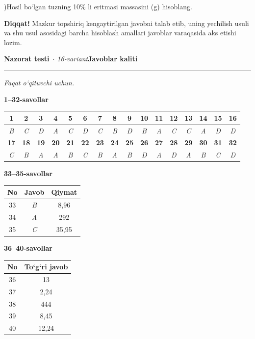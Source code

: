 \documentclass[11pt,a4paper]{article}
\newcommand{\diqqat}[1]{\par\smallskip\noindent\textbf{Diqqat!} #1\par\medskip}
\begin{document}
)Hosil bo`lgan tuzning 10\% li eritmasi massasini (g) hisoblang.\par
\diqqat{Mazkur topshiriq kengaytirilgan javobni talab etib, uning yechilish usuli va shu usul asosidagi barcha hisoblash amallari javoblar varaqasida aks etishi lozim.}
\newpage
\noindent\textbf{\fontsize{13}{15}\selectfont Nazorat testi}\ \textit{$\cdot$ 16-variant}\hfill \textbf{Javoblar kaliti}\par\smallskip\hrule\smallskip
\textit{Faqat o`qituvchi uchun.}\par\medskip
\noindent\textbf{1--32-savollar}\par\smallskip
\noindent\begin{tabular}{|c|c|c|c|c|c|c|c|c|c|c|c|c|c|c|c|}\hline
\textbf{1} & \textbf{2} & \textbf{3} & \textbf{4} & \textbf{5} & \textbf{6} & \textbf{7} & \textbf{8} & \textbf{9} & \textbf{10} & \textbf{11} & \textbf{12} & \textbf{13} & \textbf{14} & \textbf{15} & \textbf{16}\\\hline
\textsl{B} & \textsl{C} & \textsl{D} & \textsl{A} & \textsl{C} & \textsl{D} & \textsl{C} & \textsl{B} & \textsl{D} & \textsl{B} & \textsl{A} & \textsl{C} & \textsl{C} & \textsl{A} & \textsl{D} & \textsl{D}\\\hline
\textbf{17} & \textbf{18} & \textbf{19} & \textbf{20} & \textbf{21} & \textbf{22} & \textbf{23} & \textbf{24} & \textbf{25} & \textbf{26} & \textbf{27} & \textbf{28} & \textbf{29} & \textbf{30} & \textbf{31} & \textbf{32}\\\hline
\textsl{C} & \textsl{B} & \textsl{A} & \textsl{A} & \textsl{B} & \textsl{C} & \textsl{B} & \textsl{A} & \textsl{B} & \textsl{D} & \textsl{A} & \textsl{D} & \textsl{A} & \textsl{B} & \textsl{C} & \textsl{D}\\\hline
\end{tabular}\par\medskip
\noindent\textbf{33--35-savollar}\par\smallskip
\noindent\begin{tabular}{|c|c|c|}\hline \textbf{No} & \textbf{Javob} & \textbf{Qiymat}\\\hline
33 & \textsl{B} & 8,96\\\hline
34 & \textsl{A} & 292\\\hline
35 & \textsl{C} & 35,95\\\hline
\end{tabular}\par\medskip
\noindent\textbf{36--40-savollar}\par\smallskip
\noindent\begin{tabular}{|c|c|}\hline \textbf{No} & \textbf{To`g`ri javob}\\\hline
36 & 13\\\hline
37 & 2,24\\\hline
38 & 444\\\hline
39 & 8,45\\\hline
40 & 12,24\\\hline
\end{tabular}\par\medskip
\end{document}
